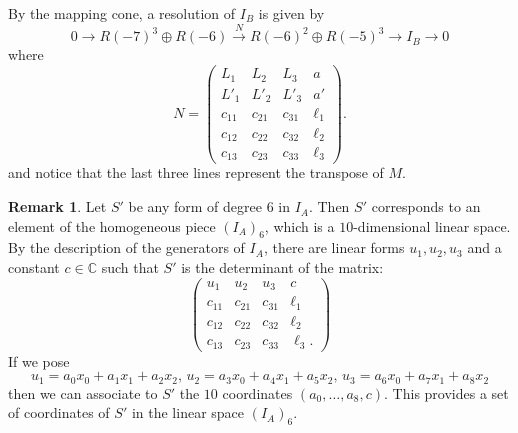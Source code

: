 \documentclass{amsart}
\newcommand{\C}{\mathbb{C}}
\theoremstyle{definition}
\newtheorem{rem0}[thm0]{Remark}
\begin{document}
By the mapping cone, a resolution of $I_B$ is given by
\begin{equation}\label{idBW}
0 \rightarrow R(-7)^{3} \oplus R(-6)  \xrightarrow {N}  R(-6)^{2} \oplus R(-5)^{3} \rightarrow I_B \rightarrow 0
\end{equation}
where
$$ N = \begin{pmatrix} L_1 & L_{2} & L_{3} & a \\ L'_1& L'_{2} & L'_{3} & a' \\  c_{11} & c_{21} & c_{31}  &  \ell_1 \\ c_{12} & c_{22} & c_{32}  &  \ell_2 \\ c_{13} & c_{23} & c_{33}  &  \ell_3
 \end{pmatrix}. $$ 
and notice that the last three lines represent the transpose of $M$.

\begin{rem0} Let $S'$ be any form of degree $6$ in $I_A$. Then $S'$ corresponds to an element of the homogeneous piece $(I_A)_6$, which is a 
$10$-dimensional linear space. By the description of the generators of $I_A$, there are linear forms $u_1,u_2,u_3$ and a constant $c\in\C$ such that 
$S'$ is the determinant of the matrix:
$$\begin{pmatrix} u_1 & u_{2} & u_{3} & c \\ c_{11} & c_{21} & c_{31} & \ell_{1} \\ c_{12} & c_{22} & c_{32} & \ell_{2}\\ c_{13} & c_{23} & c_{33} & \ell_3.  
\end{pmatrix}$$
If we pose 
$$u_1 = a_{0}x_{0}+a_{1}x_{1}+a_{2}x_{2}, \, u_{2} = a_{3}x_{0}+a_{4}x_{1}+a_{5}x_{2}, \, u_{3} = a_{6}x_{0}+a_{7}x_{1}+a_{8}x_{2}$$
then we can associate to $S'$ the $10$ coordinates $(a_0,\dots,a_8,c)$. This provides a set of coordinates of $S'$ in the linear space  $(I_A)_6$.
\end{rem0}
\end{document}
